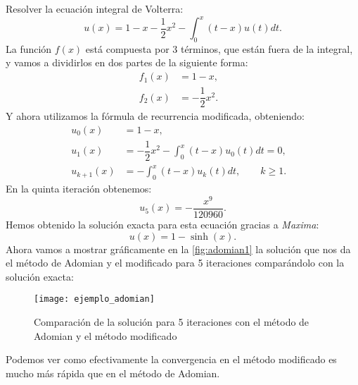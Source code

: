 \begin{ejemplo}
	Resolver la ecuación integral de Volterra:
	\begin{equation}
		u(x) = 1 -x-\dfrac{1}{2}x^2 - \int_{0}^{x}(t-x) u(t)dt.
	\end{equation}
	La función $f(x)$ está compuesta por 3 términos, que están fuera de la integral, y vamos a dividirlos en dos partes de la siguiente forma:
	\begin{align}
		f_1(x) &= 1 -x,      &   \\
		f_2(x) &=-\dfrac{1}{2}x^2.    &
	\end{align}
	Y ahora utilizamos la fórmula de recurrencia modificada, obteniendo:
	\begin{align}
		u_0(x) &=  1 -x,      &   \\
		u_{1}(x) &=-\dfrac{1}{2}x^2 - \int_{0}^{x}(t-x) u_0(t)dt = 0,    &  \\
		u_{k+1}(x) &= - \int_{0}^{x}(t-x) u_k(t)dt, \qquad k \geqslant 1.    &
	\end{align}
	En la quinta iteración obtenemos:
	\begin{equation}
		u_5(x)=-\dfrac{x^9}{120960}.
	\end{equation}
	Hemos obtenido la solución exacta para esta ecuación gracias a \textit{Maxima}:
	\begin{equation}
		u(x) = 1 - \sinh(x).
	\end{equation}
	Ahora vamos a mostrar gráficamente en la \autoref{fig:adomian1} la solución que nos da el método de Adomian y el modificado para 5 iteraciones comparándolo con la solución exacta:
	\begin{figure}[h!]
		\centering
		\texttt{[image: ejemplo\_adomian]}
		\caption{Comparación de la solución para 5 iteraciones con el método de Adomian y el método modificado}
		\label{fig:adomian1}
	\end{figure}
	\begin{observacion}
		Podemos ver como efectivamente la convergencia en el método modificado es mucho más rápida que en el método de Adomian.
\end{observacion}
\end{ejemplo}

